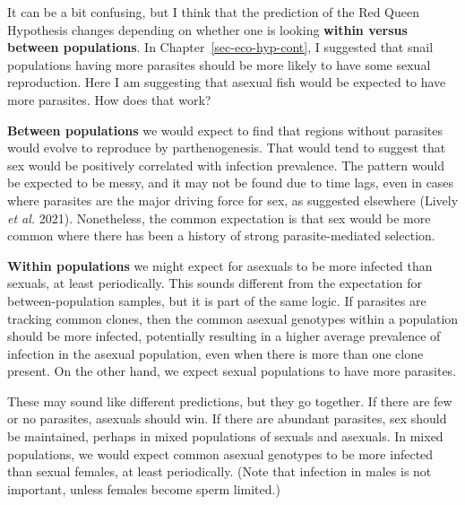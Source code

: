 \documentclass[
  letterpaper,
]{book}
\begin{document}
\begin{tcolorbox}[enhanced jigsaw, toprule=.15mm, rightrule=.15mm, arc=.35mm, titlerule=0mm, breakable, opacityback=0, leftrule=.75mm, bottomtitle=1mm, toptitle=1mm, title=\textcolor{quarto-callout-tip-color}{\faLightbulb}\hspace{0.5em}{Box 5.1}, left=2mm, coltitle=black, colframe=quarto-callout-tip-color-frame, colbacktitle=quarto-callout-tip-color!10!white, bottomrule=.15mm, opacitybacktitle=0.6, colback=white]

It can be a bit confusing, but I think that the prediction of the Red
Queen Hypothesis changes depending on whether one is looking
\textbf{within versus between populations}. In
Chapter~\ref{sec-eco-hyp-cont}, I suggested that snail populations
having more parasites should be more likely to have some sexual
reproduction. Here I am suggesting that asexual fish would be expected
to have more parasites. How does that work?

\textbf{Between populations} we would expect to find that regions
without parasites would evolve to reproduce by parthenogenesis. That
would tend to suggest that sex would be positively correlated with
infection prevalence. The pattern would be expected to be messy, and it
may not be found due to time lags, even in cases where parasites are the
major driving force for sex, as suggested elsewhere (Lively \emph{et
al.} 2021). Nonetheless, the common expectation is that sex would be
more common where there has been a history of strong parasite-mediated
selection.

\textbf{Within populations} we might expect for asexuals to be more
infected than sexuals, at least periodically. This sounds different from
the expectation for between-population samples, but it is part of the
same logic. If parasites are tracking common clones, then the common
asexual genotypes within a population should be more infected,
potentially resulting in a higher average prevalence of infection in the
asexual population, even when there is more than one clone present. On
the other hand, we expect sexual populations to have more parasites.

These may sound like different predictions, but they go together. If
there are few or no parasites, asexuals should win. If there are
abundant parasites, sex should be maintained, perhaps in mixed
populations of sexuals and asexuals. In mixed populations, we would
expect common asexual genotypes to be more infected than sexual females,
at least periodically. (Note that infection in males is not important,
unless females become sperm limited.)

\end{tcolorbox}
\end{document}
